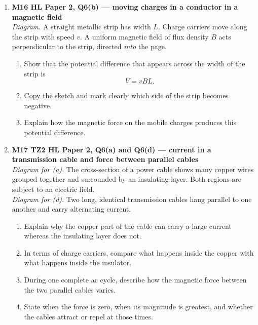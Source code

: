 \documentclass[11pt]{article}
\begin{document}
\begin{enumerate}[leftmargin=*, itemsep=1.1em]

\item \textbf{M16 HL Paper 2, Q6(b) --- moving charges in a conductor in a magnetic field}\\
\textit{Diagram.} A straight metallic strip has width $L$. Charge carriers move along the strip with speed $v$. A uniform magnetic field of flux density $B$ acts perpendicular to the strip, directed \emph{into} the page.
\begin{enumerate}[label=(\alph*)]
\item Show that the potential difference that appears across the width of the strip is
\[
V=vBL.
\]
\item Copy the sketch and mark clearly which side of the strip becomes negative.
\item Explain how the magnetic force on the mobile charges produces this potential difference.
\end{enumerate}

\item \textbf{M17 TZ2 HL Paper 2, Q6(a) and Q6(d) --- current in a transmission cable and force between parallel cables}\\
\textit{Diagram for (a).} The cross-section of a power cable shows many copper wires grouped together and surrounded by an insulating layer. Both regions are subject to an electric field.\\
\textit{Diagram for (d).} Two long, identical transmission cables hang parallel to one another and carry alternating current.
\begin{enumerate}[label=(\alph*)]
\item Explain why the copper part of the cable can carry a large current whereas the insulating layer does not.
\item In terms of charge carriers, compare what happens inside the copper with what happens inside the insulator.
\item During one complete ac cycle, describe how the magnetic force between the two parallel cables varies.
\item State when the force is zero, when its magnitude is greatest, and whether the cables attract or repel at those times.
\end{enumerate}


\end{enumerate}
\end{document}
